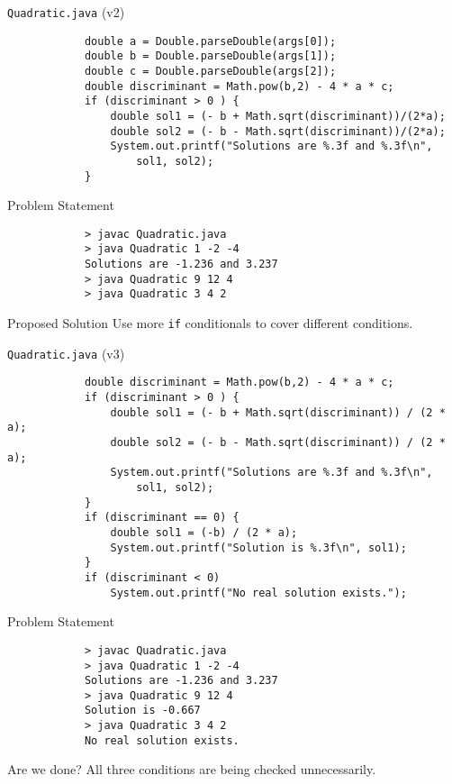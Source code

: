 \documentclass[10pt, compress]{beamer}
\begin{document}
\begin{slide}
	\begin{block}{\texttt{Quadratic.java} (v2)}
		\begin{verbatim}
			double a = Double.parseDouble(args[0]);
			double b = Double.parseDouble(args[1]);
			double c = Double.parseDouble(args[2]);
			double discriminant = Math.pow(b,2) - 4 * a * c;
			if (discriminant > 0 ) {
			    double sol1 = (- b + Math.sqrt(discriminant))/(2*a);
			    double sol2 = (- b - Math.sqrt(discriminant))/(2*a);
			    System.out.printf("Solutions are %.3f and %.3f\n",
			        sol1, sol2);
			}
		\end{verbatim}
	\end{block}
\end{slide}

\begin{slide}
	\begin{block}{Problem Statement}
		\begin{verbatim}
			> javac Quadratic.java
			> java Quadratic 1 -2 -4
			Solutions are -1.236 and 3.237
			> java Quadratic 9 12 4
			> java Quadratic 3 4 2
		\end{verbatim}
	\end{block}
	\begin{block}{Proposed Solution}
		Use more \texttt{if} conditionals to cover different conditions.
	\end{block}
\end{slide}

\begin{slide}
	\begin{block}{\texttt{Quadratic.java} (v3)}
		\begin{verbatim}
			double discriminant = Math.pow(b,2) - 4 * a * c;
			if (discriminant > 0 ) {
			    double sol1 = (- b + Math.sqrt(discriminant)) / (2 * a);
			    double sol2 = (- b - Math.sqrt(discriminant)) / (2 * a);
			    System.out.printf("Solutions are %.3f and %.3f\n",
			        sol1, sol2);
			}
			if (discriminant == 0) {
			    double sol1 = (-b) / (2 * a);
			    System.out.printf("Solution is %.3f\n", sol1);
			}
			if (discriminant < 0)
			    System.out.printf("No real solution exists.");
		\end{verbatim}
	\end{block}
\end{slide}

\begin{slide}
	\begin{block}{Problem Statement}
		\begin{verbatim}
			> javac Quadratic.java
			> java Quadratic 1 -2 -4
			Solutions are -1.236 and 3.237
			> java Quadratic 9 12 4
			Solution is -0.667
			> java Quadratic 3 4 2
			No real solution exists.
		\end{verbatim}
	\end{block}
	\begin{block}{Are we done?}
		All three conditions are being checked unnecessarily.
	\end{block}
\end{slide}
\end{document}
